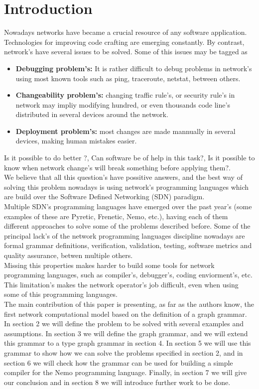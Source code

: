 \documentclass[envcountsect,runningheads]{llncs}
\begin{document}
\section{Introduction}
Nowadays networks have became a crucial resource of any software application. 
Technologies for improving code crafting are emerging constantly. By contrast, network's have 
several issues to be solved. Some of this issues may be tagged as 
\begin{itemize}
  \item \textbf{Debugging problem's:} It is rather difficult to debug problems in network's using
  most known tools such as ping, traceroute, netstat, between others.
  \item \textbf{Changeability problem's:} changing traffic rule's, or 
security rule's in network may impliy modifying hundred, or even thousands code line's 
distributed in several devices around the network.
\item \textbf{Deployment problem's:} most changes are made mannually in several devices, 
making human mistakes easier.
\end{itemize}
Is it possible to do better ?, Can software be of help in this task?, Is it possible to know 
when network change's will break something before applying them?. \\
We believe that all this question's have possitive answers, and the best way of 
solving this problem nowadays is using network's programming languages which are 
build over the Software Defined Networking (SDN) paradigm.\\
Multiple SDN's programming languages have emerged over the past year's (some examples 
of these are Pyretic, Frenetic, Nemo, etc.), having each of them different approaches to solve 
some of the problems described before. Some of the principal lack's of the network 
programming languages discipline nowadays are formal grammar definitions, verification, 
validation, testing, software metrics and quality assurance, betwen multiple others. \\
Missing this properties makes harder to build some tools for network programming languages,
such as compiler's, debugger's, coding enviorment's, etc. This limitation's 
makes the network operator's job difficult, even when using some of this 
programming languages.\\
The main contribution of this paper is presenting, as far as the authors know, 
the first network computational model based on the definition of a graph 
grammar. In section 2 we will define the problem to be solved with several 
examples and assumptions. In section 3 we will define the graph grammar, and we 
will extend this grammar to a type graph grammar in section 4. In section 5 we 
will use this grammar to show how we can solve the problems specified in section 
2, and in section 6 we will check how the grammar can be used for building a 
simple compiler for the Nemo programming language. Finally, in section 7 we will 
give our conclusion and in section 8 we will introduce further work to be done.
\end{document}

